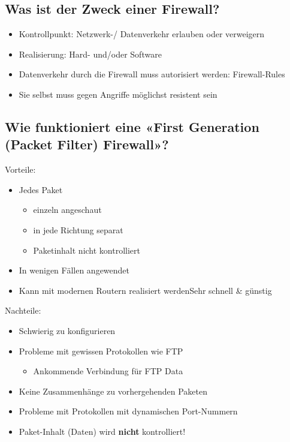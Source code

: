 \subsection*{Was ist der Zweck einer Firewall?}
\begin{itemize}
    \item Kontrollpunkt: Netzwerk-/ Datenverkehr erlauben oder verweigern
    \item Realisierung: Hard- und/oder Software
    \item Datenverkehr durch die Firewall muss autorisiert werden: Firewall-Rules
    \item Sie selbst muss gegen Angriffe möglichst resistent sein
\end{itemize}

\subsection*{Wie funktioniert eine «First Generation (Packet Filter) Firewall»?}
Vorteile:
\begin{itemize}
    \item Jedes Paket
    \begin{itemize}
        \item einzeln angeschaut
        \item in jede Richtung separat
        \item Paketinhalt nicht kontrolliert
    \end{itemize}
    \item In wenigen Fällen angewendet
    \item Kann mit modernen Routern realisiert werdenSehr schnell \& günstig
\end{itemize}
Nachteile:
\begin{itemize}
    \item Schwierig zu konfigurieren
    \item Probleme mit gewissen Protokollen wie FTP
    \begin{itemize}
        \item Ankommende Verbindung für FTP Data
    \end{itemize}
    \item Keine Zusammenhänge zu vorhergehenden Paketen
    \item Probleme mit Protokollen mit dynamischen Port-Nummern
    \item Paket-Inhalt (Daten) wird \textbf{nicht} kontrolliert!
\end{itemize}

